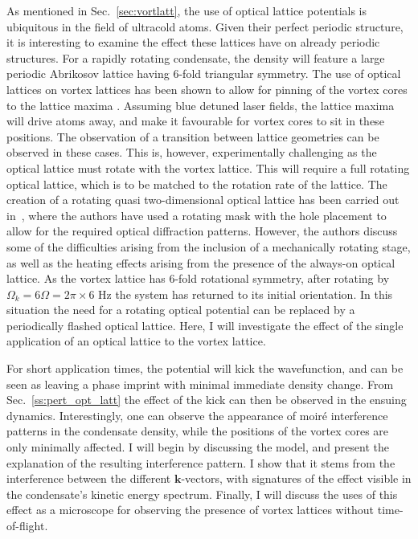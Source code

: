 As mentioned in Sec.~\ref{sec:vortlatt}, the use of optical lattice potentials is ubiquitous in the field of ultracold atoms. Given their perfect periodic structure, it is interesting to examine the effect these lattices have on already periodic structures. For a rapidly rotating condensate, the density will feature a large periodic Abrikosov lattice having $6$-fold triangular symmetry. The use of optical lattices on vortex lattices has been shown to allow for pinning of the vortex cores to the lattice maxima \cite{OL:Reijnders_prl_2004,Vtx:Tung_prl_2006}. Assuming blue detuned laser fields, the lattice maxima will drive atoms away, and make it favourable for vortex cores to sit in these positions. The observation of a transition between lattice geometries can be observed in these cases. This is, however, experimentally challenging as the optical lattice must rotate with the vortex lattice. This will require a full rotating optical lattice, which is to be matched to the rotation rate of the lattice. The creation of a rotating quasi two-dimensional optical lattice has been carried out in~\cite{Vtx:Tung_prl_2006}, where the authors have used a rotating mask with the hole placement to allow for the required optical diffraction patterns. However, the authors discuss some of the difficulties arising from the inclusion of a mechanically rotating stage, as well as the heating effects arising from the presence of the always-on optical lattice. As the vortex lattice has 6-fold rotational symmetry, after rotating by
$\Omega_{k}=6\Omega=2\pi\times 6$ Hz the system has returned to its initial orientation. In this situation the need for a rotating optical potential can be replaced by a periodically flashed optical lattice. Here, I will investigate the effect of the single application of an optical lattice to the vortex lattice.

 For short application times, the potential will kick the wavefunction, and can be seen as leaving a phase imprint with minimal immediate density change. From Sec.~\ref{ss:pert_opt_latt} the effect of the kick can then be observed in the ensuing dynamics. Interestingly, one can observe the appearance of moir\'e interference patterns in the condensate density, while the positions of the vortex cores are only minimally affected. I will begin by discussing the model, and present the explanation of the resulting interference pattern. I show that it stems from the interference between the different $\mathbf{k}$-vectors, with signatures of the effect visible in the condensate's kinetic energy spectrum. Finally, I will discuss the uses of this effect as a microscope for observing the presence of vortex lattices without time-of-flight.

